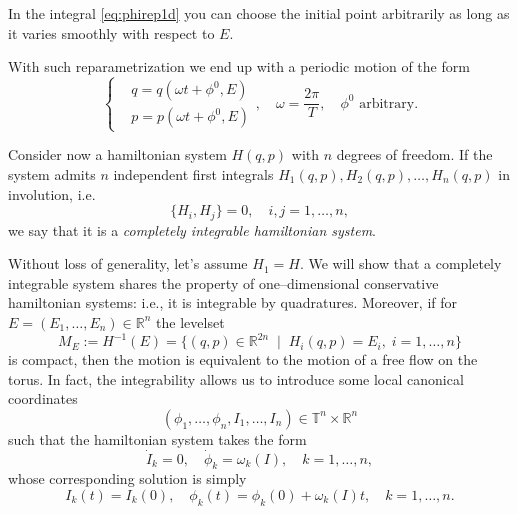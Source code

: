 \documentclass[english,fontsize=11pt,paper=a5,oneside]{scrbook}
\newcommand{\R}{\mathbb{R}}
\theoremstyle{definition}
\newenvironment{remark}
  {\pushQED{\qed}\renewcommand{\qedsymbol}{$\lozenge$}\remarkx}
  {\popQED\endremarkx}
\begin{document}
\begin{remark}
  In the integral \eqref{eq:phirep1d} you can choose the initial point arbitrarily as long as it varies smoothly with respect to $E$.
\end{remark}

With such reparametrization we end up with a periodic motion of the form
\begin{equation}
  \left\lbrace
  \begin{aligned}
     & q = q\left(\omega t + \phi^0, E\right) \\
     & p = p\left(\omega t + \phi^0, E\right)
  \end{aligned}
  \right., \quad \omega = \frac{2\pi}{T}, \quad \phi^0\mbox{ arbitrary}.
\end{equation}

\begin{tcolorbox}
  Consider now a hamiltonian system $H(q,p)$ with $n$ degrees of freedom.
  If the system admits $n$ independent first integrals $H_1(q,p), H_2(q,p), \ldots, H_n(q,p)$ in involution, i.e.
  \begin{equation}
    \big\{H_i, H_j\big\} = 0,\quad i,j=1,\ldots,n,
  \end{equation}
  we say that it is a \emph{completely integrable hamiltonian system}.
\end{tcolorbox}

Without loss of generality, let's assume $H_1 = H$.
We will show that a completely integrable system shares the property of one--dimensional conservative hamiltonian systems: i.e., it is integrable by quadratures.
Moreover, if for $E = (E_1, \ldots, E_n)\in\R^n$ the levelset
\begin{equation}\label{eq:levelsetE}
  M_E := H^{-1}(E) = \big\{(q,p)\in\R^{2n} \;\mid\; H_i(q,p)=E_i,\;i=1,\ldots,n \big\}
\end{equation}
is compact, then the motion is equivalent to the motion of a free flow on the torus.
In fact, the integrability allows us to introduce some local canonical coordinates
\begin{equation}\label{eq:actionalngle}
  (\phi_1, \ldots, \phi_n, I_1, \ldots, I_n) \in \mathbb{T}^n\times\R^n
\end{equation}
such that the hamiltonian system takes the form
\begin{equation}
  \dot I_k = 0, \quad \dot \phi_k = \omega_k(I), \quad k=1,\ldots,n,
\end{equation}
whose corresponding solution is simply
\begin{equation}
  I_k(t)= I_k(0), \quad
  \phi_k(t) = \phi_k(0) + \omega_k(I)t, \quad k = 1,\ldots, n.
\end{equation}
\end{document}
